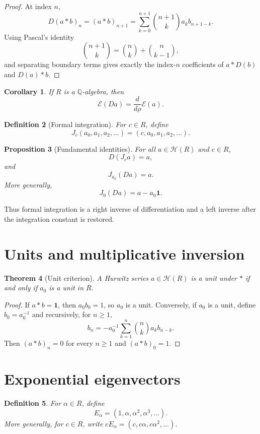 \documentclass[11pt]{article}
\newtheorem{theorem}{Theorem}[section]
\newtheorem{proposition}[theorem]{Proposition}
\newtheorem{corollary}[theorem]{Corollary}
\newtheorem{definition}[theorem]{Definition}
\newcommand{\Hurs}{\mathcal H}
\newcommand{\Q}{\mathbb Q}
\begin{document}
\begin{proof}
At index $n$,
\[
D(a*b)_n=(a*b)_{n+1}
=\sum_{k=0}^{n+1}\binom{n+1}{k}a_kb_{n+1-k}.
\]
Using Pascal's identity
\[
\binom{n+1}{k}=\binom nk+\binom n{k-1},
\]
and separating boundary terms gives exactly the index-$n$ coefficients of $a*D(b)$ and $D(a)*b$.
\end{proof}

\begin{corollary}
If $R$ is a $\Q$-algebra, then
\[
\mathcal E(Da)=\frac{d}{d\rho}\mathcal E(a).
\]
\end{corollary}

\begin{definition}[Formal integration]
For $c\in R$, define
\[
J_c(a_0,a_1,a_2,\ldots)=(c,a_0,a_1,a_2,\ldots).
\]
\end{definition}

\begin{proposition}[Fundamental identities]
For all $a\in\Hurs(R)$ and $c\in R$,
\[
D(J_c a)=a,
\]
and
\[
J_{a_0}(Da)=a.
\]
More generally,
\[
J_0(Da)=a-a_0\mathbf 1.
\]
\end{proposition}

Thus formal integration is a right inverse of differentiation and a left inverse after the integration constant is restored.

\section{Units and multiplicative inversion}

\begin{theorem}[Unit criterion]
A Hurwitz series $a\in\Hurs(R)$ is a unit under $*$ if and only if $a_0$ is a unit in $R$.
\end{theorem}

\begin{proof}
If $a*b=\mathbf1$, then $a_0b_0=1$, so $a_0$ is a unit.  Conversely, if $a_0$ is a unit, define $b_0=a_0^{-1}$ and recursively, for $n\ge1$,
\[
b_n=-a_0^{-1}\sum_{k=1}^{n}\binom nk a_kb_{n-k}.
\]
Then $(a*b)_n=0$ for every $n\ge1$ and $(a*b)_0=1$.
\end{proof}

\section{Exponential eigenvectors}

\begin{definition}
For $\alpha\in R$, define
\[
E_\alpha=(1,\alpha,\alpha^2,\alpha^3,\ldots).
\]
More generally, for $c\in R$, write $cE_\alpha=(c,c\alpha,c\alpha^2,\ldots)$.
\end{definition}
\end{document}
